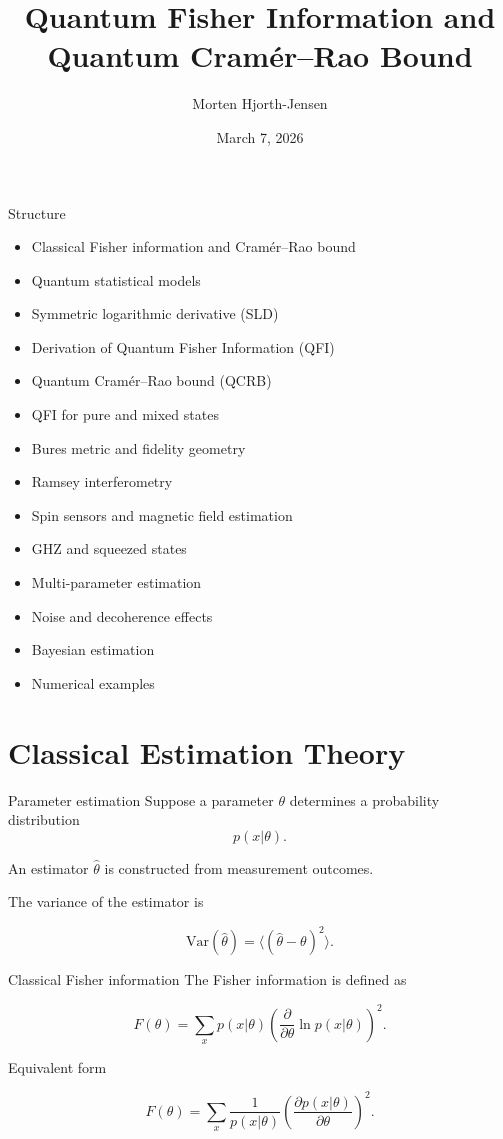 \documentclass[aspectratio=169]{beamer}
\title{Quantum Fisher Information and Quantum Cramér–Rao Bound}
\author{Morten Hjorth-Jensen}
\date{March 7, 2026}
\begin{document}
\frame{\titlepage}

\begin{frame}{Structure}
\begin{itemize}
\item Classical Fisher information and Cramér–Rao bound
\item Quantum statistical models
\item Symmetric logarithmic derivative (SLD)
\item Derivation of Quantum Fisher Information (QFI)
\item Quantum Cramér–Rao bound (QCRB)
\item QFI for pure and mixed states
\item Bures metric and fidelity geometry
\item Ramsey interferometry
\item Spin sensors and magnetic field estimation
\item GHZ and squeezed states
\item Multi-parameter estimation
\item Noise and decoherence effects
\item Bayesian estimation
\item Numerical examples
\end{itemize}
\end{frame}

\section{Classical Estimation Theory}

\begin{frame}{Parameter estimation}
Suppose a parameter $\theta$ determines a probability distribution
\begin{equation}
p(x|\theta).
\end{equation}

An estimator $\hat{\theta}$ is constructed from measurement outcomes.

The variance of the estimator is

\begin{equation}
\mathrm{Var}(\hat{\theta})
=
\langle(\hat{\theta}-\theta)^2\rangle .
\end{equation}
\end{frame}

\begin{frame}{Classical Fisher information}
The Fisher information is defined as

\begin{equation}
F(\theta)
=
\sum_x
p(x|\theta)
\left(
\frac{\partial}{\partial \theta}
\ln p(x|\theta)
\right)^2 .
\end{equation}

Equivalent form

\begin{equation}
F(\theta)
=
\sum_x
\frac{1}{p(x|\theta)}
\left(
\frac{\partial p(x|\theta)}{\partial \theta}
\right)^2 .
\end{equation}
\end{frame}
\end{document}
